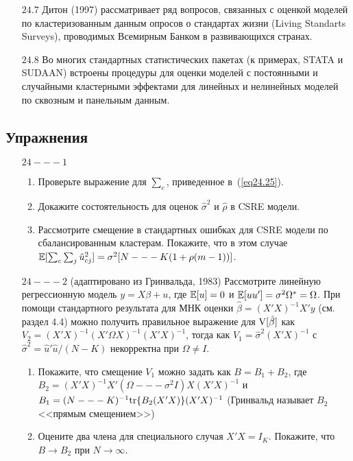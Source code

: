 \begin{enumerate}
\item[$24.7$] Дитон (1997) рассматривает ряд вопросов, связанных с оценкой моделей по кластеризованным данным опросов о стандартах жизни (Living Standarts Surveys), проводимых Всемирным Банком в развивающихся странах. 
\item[$24.8$] Во многих стандартных статистических пакетах (к примерах, STATA и SUDAAN) встроены процедуры для оценки моделей с постоянными и случайными кластерными эффектами для линейных и нелинейных моделей по сквозным и панельным данным. 
\end{enumerate}

\subsection*{Упражнения}

\begin{enumerate}
\item[$24 --- 1$]
\begin{enumerate}
\item Проверьте выражение для $\sum_c$, приведенное в~(\ref{eq24.25}).
\item Докажите состоятельность для оценок $\hat \sigma ^2$ и $\hat \rho$ в CSRE модели.
\item Рассмотрите смещение в стандартных ошибках для CSRE модели по сбалансированным кластерам. Покажите, что в этом случае $\mathbb{E} [\sum_c \sum_j \hat u^2_{cj}] = \sigma^2 [N --- K (1 + \rho (m-1))]$. 
\end{enumerate}

\item[$24 --- 2$] (адаптировано из Гринвальда, 1983) Рассмотрите линейную регрессионную модель $y = X \beta + u$, где $\mathbb{E}[u] = 0$ и $\mathbb{E} [uu'] = \sigma^2 \Omega^* = \Omega$. При помощи стандартного результата для МНК оценки $\hat \beta = (X'X)^{-1} X'y$ (см. раздел 4.4) можно получить правильное выражение для $\mathrm{V}[\hat \beta]$ как $V_2 = (X'X)^{-1} (X' \Omega X)^{-1} (X'X)^{-1}$, тогда как $V_1 = \hat \sigma^2 (X'X)^{-1}$ с $\hat \sigma^2 = \hat u' \hat u / (N-K)$ некорректна при $\Omega \ne I$. 
\begin{enumerate}
\item Покажите, что смещение $V_1$ можно задать как $B = B_1 + B_2$, где $B_2 = (X'X)^{-1} X' (\Omega --- \sigma^2 I) X (X'X)^{-1}$ и $B_1 = (N --- K)^{-1} \mathrm{tr}\{B_2 (X'X)\} (X'X)^{-1}$ (Гринвальд называет $B_2$ <<прямым смещением>>)
\item Оцените два члена для специального случая $X'X = I_K$. Покажите, что $B \to B_2$ при $N \to \infty$. 
\end{enumerate}


\end{enumerate}

